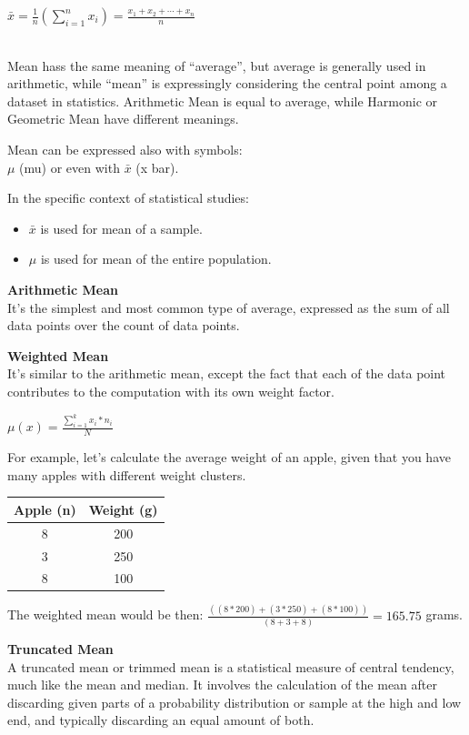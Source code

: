 \documentclass{article}
\begin{document}
${\displaystyle {\bar{x}}={\frac{1}{n}}\left(\sum _{i=1}^{n}{x_{i}}\right)={\frac{x_{1}+x_{2}+\cdots +x_{n}}{n}}}$

\mbox{} \\

Mean hass the same meaning of “average”, but average is generally used in arithmetic, while “mean” is expressingly considering the central point among a dataset in statistics. Arithmetic Mean is equal to average, while Harmonic or Geometric Mean have different meanings. 

Mean can be expressed also with symbols:\\
$\mu$ (mu) or even with $\bar{x}$ (x bar).

In the specific context of statistical studies:
\begin{itemize}
    \item $\bar{x}$ is used for mean of a  sample.
    \item $\mu$ is used for mean of the entire population.
\end{itemize}

\textbf{Arithmetic Mean} \\
It's the simplest and most common type of  average, expressed as the sum of all data points over the count of data points.

\textbf{Weighted Mean} \\ 
It's similar to the arithmetic mean, except the fact that each of the data point contributes to the computation with its own weight factor.

$ \displaystyle \mu(x) = \frac{\sum \limits ^{k} _{i=1} x_i * n_i}{N}$

For example, let's calculate the average weight of an apple, given that you have many apples with different weight clusters.

\begin{center}
\begin{tabular}{|c|c|}
\hline
Apple (n) & Weight (g) \\ \hline
8 & 200 \\ 
3 & 250 \\ 
8 & 100 \\
\hline
\end{tabular}
\end{center}

The weighted mean would be then: $\frac{((8*200)+(3*250)+(8*100))}{(8+3+8)} = 165.75$ grams.  

\textbf{Truncated Mean} \\ 
A truncated mean or trimmed mean is a statistical measure of central tendency, much like the mean and median. It involves the calculation of the mean after discarding given parts of a probability distribution or sample at the high and low end, and typically discarding an equal amount of both. 
\end{document}
